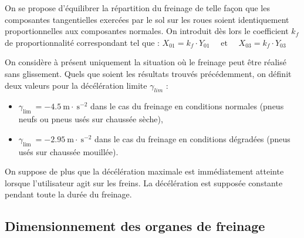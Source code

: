 On se propose d'équilibrer la répartition du freinage de telle façon que les composantes tangentielles exercées par le sol sur les roues soient identiquement proportionnelles aux composantes normales. On introduit dès lors le coefficient \(k_{f}\) de proportionnalité correspondant tel que :
$
X_{01}=k_{f} \cdot Y_{01} \quad \text { et } \quad X_{03}=k_{f} \cdot Y_{03}
$



On considère à présent uniquement la situation où le freinage peut être réalisé sans glissement. Quels que soient les résultats trouvés précédemment, on définit deux valeurs pour la décélération limite \(\gamma_{l i m}\) :

\begin{itemize}
  \item \(\gamma_{\text {lim }}=-4.5 \mathrm{~m} \cdot \mathrm{~s}^{-2}\) dans le cas du freinage en conditions normales (pneus neufs ou pneus usés sur chaussée sèche),
  \item \(\gamma_{\text {lim }}=-2.95 \mathrm{~m} \cdot \mathrm{~s}^{-2}\) dans le cas du freinage en conditions dégradées (pneus usés sur chaussée mouillée).
\end{itemize}

On suppose de plus que la décélération maximale est immédiatement atteinte lorsque l'utilisateur agit sur les freins. La décélération est supposée constante pendant toute la durée du freinage.




\subsection{Dimensionnement des organes de freinage}

